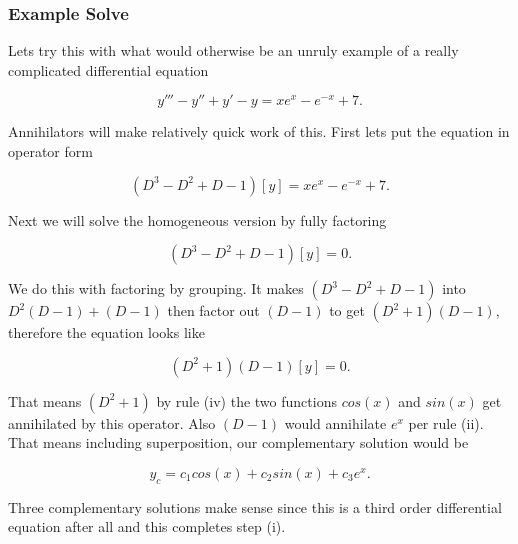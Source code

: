 \documentclass[12pt]{article}
\begin{document}
\vspace{10pt}

\subsubsection{Example Solve}

Lets try this with what would otherwise be an unruly example of a really complicated differential equation

\begin{equation*}
    y'''-y''+y'-y=xe^{x}-e^{-x}+7.
\end{equation*}

Annihilators will make relatively quick work of this. First lets put the equation in operator form

\begin{equation*}
    (D^3-D^2+D-1)[y]=xe^{x}-e^{-x}+7.
\end{equation*}

Next we will solve the homogeneous version by fully factoring

\begin{equation*}
    (D^3-D^2+D-1)[y]=0.
\end{equation*}

We do this with factoring by grouping. It makes $(D^3-D^2+D-1)$ into $D^2(D-1)+(D-1)$ then factor out $(D-1)$ to get $(D^2+1)(D-1)$, therefore the equation looks like

\begin{equation*}
    (D^2+1)(D-1)[y]=0.
\end{equation*}

That means $(D^2+1)$ by rule (iv) the two functions $cos(x)$ and $sin(x)$ get annihilated by this operator. Also $(D-1)$ would annihilate $e^x$ per rule (ii). That means including superposition, our complementary solution would be

\begin{equation*}
    y_c=c_1cos(x)+c_2sin(x)+c_3e^x.
\end{equation*}

Three complementary solutions make sense since this is a third order differential equation after all and this completes step (i).

\vspace{10pt}
\end{document}
